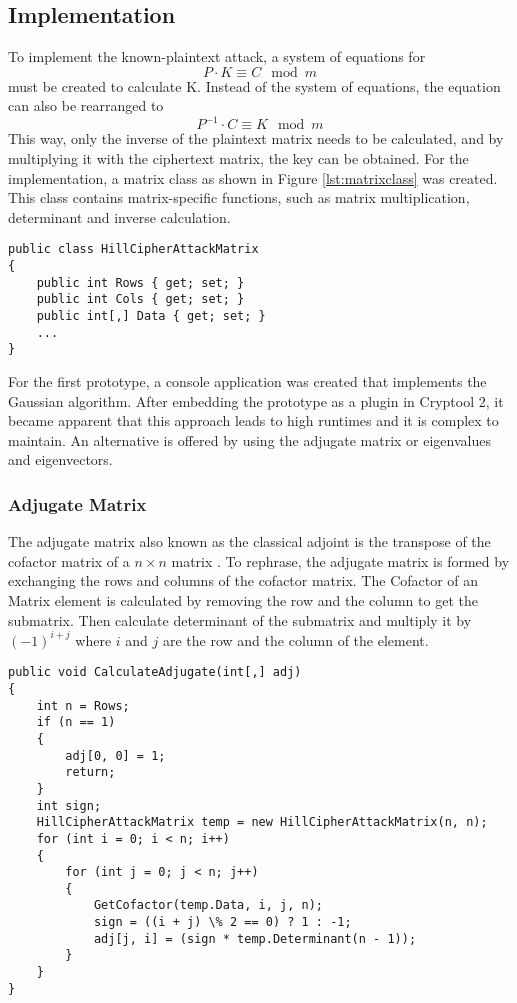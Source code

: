 \documentclass[conference]{IEEEtran}
\begin{document}
\subsection{Implementation}
To implement the known-plaintext attack, a system of equations for \[P \cdot K \equiv C \mod m\] must be created to calculate K.
Instead of the system of equations, the equation can also be rearranged to \[P^{-1} \cdot C \equiv K \mod m\] This way, only the inverse of the plaintext matrix needs to be calculated, and by multiplying it with the ciphertext matrix, the key can be obtained.
For the implementation, a matrix class as shown in Figure \ref{lst:matrixclass} was created. This class contains matrix-specific functions, such as matrix multiplication, determinant and inverse calculation.
\\
\begin{lstlisting}[caption={HillCipherAttackMatrix class}, label={lst:matrixclass}]
public class HillCipherAttackMatrix
{
    public int Rows { get; set; }
    public int Cols { get; set; }
    public int[,] Data { get; set; }
    ...
}
\end{lstlisting}

For the first prototype, a console application was created that implements the Gaussian algorithm. After embedding the prototype as a plugin in Cryptool 2, it became apparent that this approach leads to high runtimes and it is complex to maintain. An alternative is offered by using the adjugate matrix or eigenvalues and eigenvectors.\\


\subsubsection{Adjugate Matrix}

The adjugate matrix also known as the classical adjoint is the transpose of the cofactor matrix of a \( n \times n \) matrix . To rephrase, the adjugate matrix is formed by exchanging the rows and columns of the cofactor matrix.
The Cofactor of an Matrix element is calculated by removing the row and the column to get the submatrix. Then calculate determinant of the submatrix and multiply it by \((-1)^{i+j}\) where \(i\) and \(j\) are the row and the column of the element. 

\begin{lstlisting}[caption={CalculateAdjugate method}, label={lst:calcAdj}]
public void CalculateAdjugate(int[,] adj)
{
    int n = Rows;
    if (n == 1)
    {
        adj[0, 0] = 1;
        return;
    }
    int sign;
    HillCipherAttackMatrix temp = new HillCipherAttackMatrix(n, n);
    for (int i = 0; i < n; i++)
    {
        for (int j = 0; j < n; j++)
        {
            GetCofactor(temp.Data, i, j, n);
            sign = ((i + j) \% 2 == 0) ? 1 : -1;
            adj[j, i] = (sign * temp.Determinant(n - 1));
        }
    }
}
\end{lstlisting}
\end{document}
